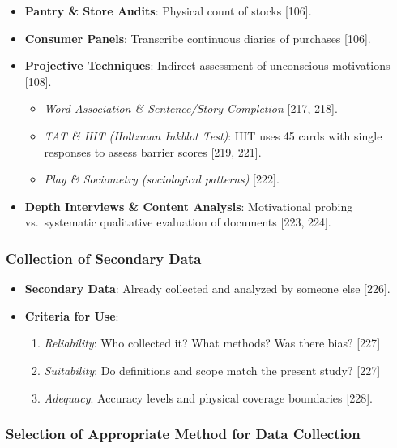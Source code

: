 \documentclass[
]{article}
\providecommand{\tightlist}{%
  \setlength{\itemsep}{0pt}\setlength{\parskip}{0pt}}
\begin{document}
\begin{itemize}
\tightlist
\item
  \textbf{Pantry \& Store Audits}: Physical count of stocks {[}106{]}.
\item
  \textbf{Consumer Panels}: Transcribe continuous diaries of purchases
  {[}106{]}.
\item
  \textbf{Projective Techniques}: Indirect assessment of unconscious
  motivations {[}108{]}.

  \begin{itemize}
  \tightlist
  \item
    \emph{Word Association \& Sentence/Story Completion} {[}217, 218{]}.
  \item
    \emph{TAT \& HIT (Holtzman Inkblot Test)}: HIT uses 45 cards with
    single responses to assess barrier scores {[}219, 221{]}.
  \item
    \emph{Play \& Sociometry (sociological patterns)} {[}222{]}.
  \end{itemize}
\item
  \textbf{Depth Interviews \& Content Analysis}: Motivational probing
  vs.~systematic qualitative evaluation of documents {[}223, 224{]}.
\end{itemize}

\subsubsection{Collection of Secondary
Data}\label{collection-of-secondary-data}

\begin{itemize}
\tightlist
\item
  \textbf{Secondary Data}: Already collected and analyzed by someone
  else {[}226{]}.
\item
  \textbf{Criteria for Use}:

  \begin{enumerate}
  \def\labelenumi{\arabic{enumi}.}
  \tightlist
  \item
    \emph{Reliability}: Who collected it? What methods? Was there bias?
    {[}227{]}
  \item
    \emph{Suitability}: Do definitions and scope match the present
    study? {[}227{]}
  \item
    \emph{Adequacy}: Accuracy levels and physical coverage boundaries
    {[}228{]}.
  \end{enumerate}
\end{itemize}

\subsubsection{Selection of Appropriate Method for Data
Collection}\label{selection-of-appropriate-method-for-data-collection}
\end{document}
